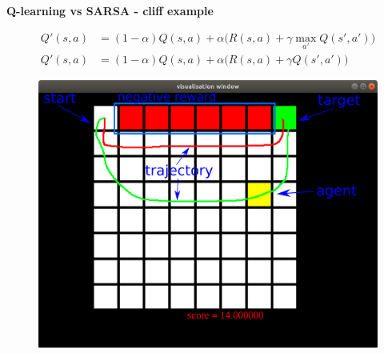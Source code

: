 \documentclass[xcolor=dvipsnames]{beamer}
\begin{document}
\begin{frame}{\bf Q-learning vs SARSA - cliff example}

\begin{align*}
Q'(s, a) &= (1-\alpha)Q(s, a) + \alpha\Big(R(s, a) + \gamma \max \limits_{a'} Q(s', a')\Big) \\
Q'(s, a) &= (1-\alpha)Q(s, a) + \alpha\Big(R(s, a) + \gamma Q(s', a')\Big)
\end{align*}


\begin{figure}
  \includegraphics[scale=0.35]{../../diagrams/cliff_diagram.png}
\end{figure}

\end{frame}
\end{document}
